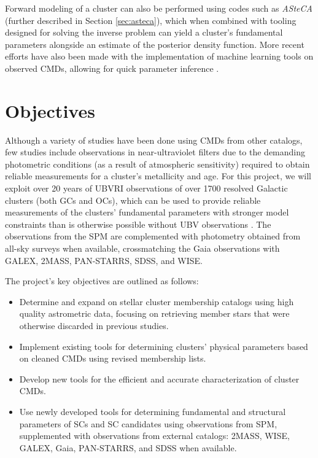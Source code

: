 Forward modeling of a cluster can also be performed using codes such as \textit{ASteCA} (further described in Section \ref{sec:asteca}), which when combined with tooling designed for solving the inverse problem can yield a cluster's fundamental parameters alongside an estimate of the posterior density function. More recent efforts have also been made with the implementation of  machine learning tools on observed CMDs, allowing for quick parameter inference \autocite{huntImprovingOpenCluster2023a,cavalloParameterEstimationOpen2023,cantat-gaudinPaintingPortraitGalactic2020a}.

\section{Objectives}
Although a variety of studies have been done using CMDs from other catalogs, few studies include observations in near-ultraviolet filters due to the demanding photometric conditions (as a result of atmospheric sensitivity) required to obtain reliable measurements for a cluster's metallicity and age. For this project, we will exploit over 20 years of UBVRI observations of over 1700 resolved Galactic clusters (both GCs and OCs), which can be used to provide reliable measurements of the clusters' fundamental parameters with stronger model constraints than is otherwise possible without UBV observations \autocite{kavirajBetterAgeEstimation2007}. The observations from the SPM are complemented with photometry obtained from all-sky surveys when available, crossmatching the Gaia observations with GALEX, 2MASS, PAN-STARRS, SDSS, and WISE.

The project's key objectives are outlined as follows:

\begin{itemize}
    \item Determine and expand on stellar cluster membership catalogs using high quality astrometric data, focusing on retrieving member stars that were otherwise discarded in previous studies.
    \item Implement existing tools for determining clusters' physical parameters based on cleaned CMDs using revised membership lists.
    \item Develop new tools for the efficient and accurate characterization of cluster CMDs.
    \item Use newly developed tools for determining fundamental and structural parameters of SCs and SC candidates using observations from SPM, supplemented with observations from external catalogs: 2MASS, WISE, GALEX, Gaia, PAN-STARRS, and SDSS when available.
\end{itemize}

